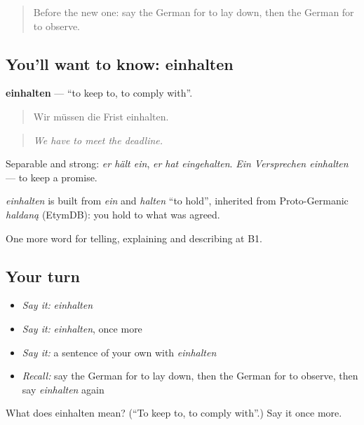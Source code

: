 \begin{quote}
Before the new one: say the German for to lay down, then the German for to observe.
\end{quote}

\subsection*{You'll want to know: einhalten}
\textbf{einhalten} — \textquotedblleft{}to keep to, to comply with\textquotedblright{}.

\begin{quote}
Wir müssen die Frist einhalten.
\end{quote}

\begin{quote}
\emph{We have to meet the deadline.}
\end{quote}

Separable and strong: \emph{er hält ein}, \emph{er hat eingehalten}. \emph{Ein Versprechen einhalten} — to keep a promise.

\begin{cousinweb}
\emph{einhalten} is built from \emph{ein} and \emph{halten} \textquotedblleft{}to hold\textquotedblright{}, inherited from Proto-Germanic \emph{haldaną} (EtymDB): you hold to what was agreed.
\end{cousinweb}

\begin{grammarlens}[title={What you've built}]
One more word for telling, explaining and describing at B1.
\end{grammarlens}

\subsection*{Your turn}
\begin{itemize}
\raggedright
  \item \emph{Say it:} \emph{einhalten}
  \item \emph{Say it:} \emph{einhalten}, once more
  \item \emph{Say it:} a sentence of your own with \emph{einhalten}
  \item \emph{Recall:} say the German for to lay down, then the German for to observe, then say \emph{einhalten} again
\end{itemize}

\begin{tcolorbox}[breakable,colback=teal!4,colframe=teal!35!black,title={Before you move on}]
What does einhalten mean? (\textquotedblleft{}To keep to, to comply with\textquotedblright{}.) Say it once more.
\end{tcolorbox}
